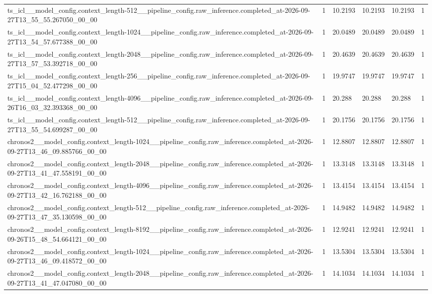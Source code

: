 \begin{tabular}{llllll}
ts\_icl\_\_model\_config.context\_length-512\_\_pipeline\_config.raw\_inference.completed\_at-2026-09-27T13\_55\_55.267050\_00\_00 & 1 & 10.2193 & 10.2193 & 10.2193 & 1 \\
ts\_icl\_\_model\_config.context\_length-1024\_\_pipeline\_config.raw\_inference.completed\_at-2026-09-27T13\_54\_57.677388\_00\_00 & 1 & 20.0489 & 20.0489 & 20.0489 & 1 \\
ts\_icl\_\_model\_config.context\_length-2048\_\_pipeline\_config.raw\_inference.completed\_at-2026-09-27T13\_57\_53.392718\_00\_00 & 1 & 20.4639 & 20.4639 & 20.4639 & 1 \\
ts\_icl\_\_model\_config.context\_length-256\_\_pipeline\_config.raw\_inference.completed\_at-2026-09-27T15\_04\_52.477298\_00\_00 & 1 & 19.9747 & 19.9747 & 19.9747 & 1 \\
ts\_icl\_\_model\_config.context\_length-4096\_\_pipeline\_config.raw\_inference.completed\_at-2026-09-26T16\_03\_32.393368\_00\_00 & 1 & 20.288 & 20.288 & 20.288 & 1 \\
ts\_icl\_\_model\_config.context\_length-512\_\_pipeline\_config.raw\_inference.completed\_at-2026-09-27T13\_55\_54.699287\_00\_00 & 1 & 20.1756 & 20.1756 & 20.1756 & 1 \\
chronos2\_\_model\_config.context\_length-1024\_\_pipeline\_config.raw\_inference.completed\_at-2026-09-27T13\_46\_09.885766\_00\_00 & 1 & 12.8807 & 12.8807 & 12.8807 & 1 \\
chronos2\_\_model\_config.context\_length-2048\_\_pipeline\_config.raw\_inference.completed\_at-2026-09-27T13\_41\_47.558191\_00\_00 & 1 & 13.3148 & 13.3148 & 13.3148 & 1 \\
chronos2\_\_model\_config.context\_length-4096\_\_pipeline\_config.raw\_inference.completed\_at-2026-09-27T13\_42\_16.762188\_00\_00 & 1 & 13.4154 & 13.4154 & 13.4154 & 1 \\
chronos2\_\_model\_config.context\_length-512\_\_pipeline\_config.raw\_inference.completed\_at-2026-09-27T13\_47\_35.130598\_00\_00 & 1 & 14.9482 & 14.9482 & 14.9482 & 1 \\
chronos2\_\_model\_config.context\_length-8192\_\_pipeline\_config.raw\_inference.completed\_at-2026-09-26T15\_48\_54.664121\_00\_00 & 1 & 12.9241 & 12.9241 & 12.9241 & 1 \\
chronos2\_\_model\_config.context\_length-1024\_\_pipeline\_config.raw\_inference.completed\_at-2026-09-27T13\_46\_09.418572\_00\_00 & 1 & 13.5304 & 13.5304 & 13.5304 & 1 \\
chronos2\_\_model\_config.context\_length-2048\_\_pipeline\_config.raw\_inference.completed\_at-2026-09-27T13\_41\_47.047080\_00\_00 & 1 & 14.1034 & 14.1034 & 14.1034 & 1 \\

\end{tabular}
